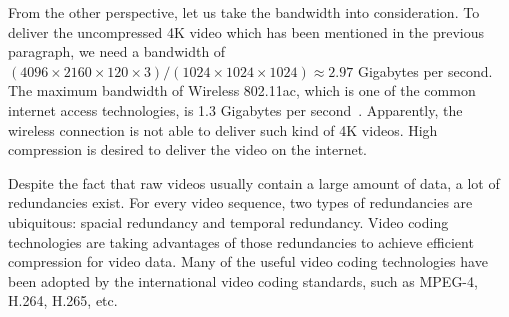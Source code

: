 From the other perspective, let us take the bandwidth into consideration.
To deliver the uncompressed 4K video which has been mentioned in
the previous paragraph, we need a bandwidth of
\((4096\times2160\times120\times3)/(1024\times1024\times1024) \approx 2.97\) Gigabytes per second.
The maximum bandwidth of Wireless 802.11ac, which is one of the common
internet access technologies, is 1.3 Gigabytes per second~\parencite{RN203}.
Apparently, the wireless connection is not able to deliver such kind of
4K videos.
High compression is desired to deliver the video on the internet.

Despite the fact that raw videos usually contain a large amount of data,
a lot of redundancies exist.
For every video sequence, two types of redundancies are ubiquitous: spacial
redundancy and temporal redundancy.
Video coding technologies are taking advantages of those redundancies to
achieve efficient compression for video data.
Many of the useful video coding technologies have been adopted by the
international video coding standards, such as MPEG-4, H.264, H.265, etc.

